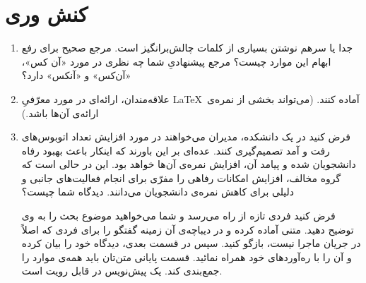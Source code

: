 \documentclass{article}
\begin{document}
\section{کنش وری}
\begin{enumerate}
\item جدا یا سرهم نوشتن بسیاری از کلمات چالش‌برانگیز است. مرجع صحیح برای رفع ابهام این موارد چیست؟ مرجع پیشنهادیِ شما چه نظری در مورد «آن کس»، «آن‌کس» و «آنکس» دارد؟
\item علاقه‌مندان، ارائه‌ای در مورد معرّفیِ \LaTeX~آماده کنند. (می‌تواند بخشی از نمره‌ی ارائه‌ی آن‌ها باشد.)
\item فرض کنید در یک دانشکده، مدیران می‌خواهند در مورد افزایش تعداد اتوبوس‌های رفت و آمد تصمیم‌گیری کنند. عده‌ای بر این باورند که اینکار باعث بهبود رفاه دانشجویان شده و پیامد آن، افزایش نمره‌ی آن‌ها خواهد بود. این در حالی است که گروه مخالف، افزایش امکانات رفاهی را مفرّی برای انجام فعالیت‌های جانبی و دلیلی برای کاهش نمره‌ی دانشجویان می‌دانند. دیدگاه شما چیست؟

	فرض کنید فردی تازه از راه می‌رسد و شما می‌خواهید موضوع بحث را به وی توضیح دهید. متنی آماده کرده و در دیباچه‌ی آن زمینه گفتگو را برای فردی که اصلاً در جریان ماجرا نیست، بازگو کنید. سپس در قسمت بعدی، دیدگاه خود را بیان کرده و آن را با ره‌آوردها‌ی خود همراه نمائید. قسمت پایانی متن‌تان باید همه‌ی موارد را جمع‌بندی کند. یک پیش‌نویس در  قابل رویت است.
\end{enumerate}
\end{document}
